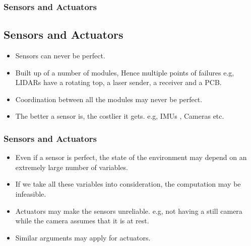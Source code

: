 \documentclass{beamer}
\begin{document}



	\begin{frame}
		\frametitle{Sensors and Actuators}
		\subsection{Sensors and Actuators}

		\begin{itemize}
			\item Sensors can never be perfect.\medskip
			\item Built up of a number of modules, Hence multiple points of failures e.g, LIDARs have a rotating top, a laser sender, a receiver and a PCB.\medskip
			\item Coordination between all the modules may never be perfect.\medskip
			\item The better a sensor is, the costlier it gets. e.g, IMUs%
			, Cameras etc. %
		\end{itemize}

	\end{frame}




	\begin{frame}
		\frametitle{Sensors and Actuators}
		
		\begin{itemize}
			\item Even if a sensor is perfect, the state of the environment may depend on an extremely large number of variables.\medskip
			\item If we take all these variables into consideration, the computation may be infeasible.\medskip
			\item Actuators may make the sensors unreliable. e.g, not having a still camera while the camera assumes that it is at rest.\medskip
			\item Similar arguments may apply for actuators.
		\end{itemize}

	\end{frame}
\end{document}
